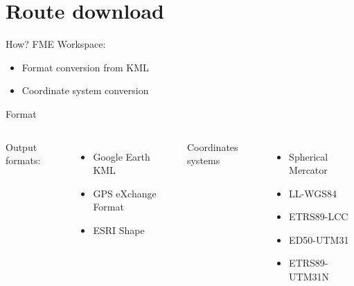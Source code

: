 \documentclass[10pt, compress]{beamer}
\begin{document}
{
\plain{}{}
}


\section{Route download}
\begin{frame}{How?}
    FME Workspace:
    \begin{itemize}
        \item Format conversion from KML
        \item Coordinate system conversion
    \end{itemize}
    
\end{frame}
\begin{frame}{Format}
\begin{columns}[onlytextwidth]
        Output formats:
        \begin{itemize}
            \item Google Earth KML
            \item GPS eXchange Format
            \item ESRI Shape
        \end{itemize}
        Coordinates systems
        \begin{itemize}
            \item Spherical Mercator
            \item LL-WGS84
            \item ETRS89-LCC
            \item ED50-UTM31
            \item ETRS89-UTM31N
        \end{itemize}
    \end{columns}
\end{frame}
\end{document}
